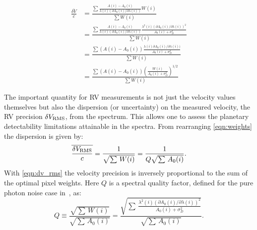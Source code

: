 \begin{align}
    \frac{\overline{\delta V}}{c} &= \frac{
        \sum{
            \frac
            {A(i) - {A}_{0}(i)}{
                \lambda(i) \left({\partial {A}_{0}(i)}/{\partial \lambda(i)}\right)} W(i)}
            }
            {\sum{{W(i)}}} \\
    &= \frac{
        \sum {
            \frac
                {A(i) - {A}_{0}(i)}
                {\lambda(i) (\partial {A}_{0}(i)/\partial \lambda(i))}
                \frac
                {{\lambda}^{2}(i) {({\partial {A}_{0}(i)}/{\partial \lambda(i)})}^{2}}
                {A_{0}(i) + {\sigma}^{2}_{D}}
             }
            }
        {\sum{{W(i)}}} \\
    &= \frac{
        \sum { 
            (A(i) - {A}_{0}(i))
            \frac
            {\lambda(i) {\partial {A}_{0}(i)}/{\partial \lambda(i)})}
            {A_{0}(i) + {\sigma}^{2}_{D}}
         }
        }
        {\sum{{W(i)}}} \\
    &= \frac{\sum{(A(i) - {A}_{0}(i)){\left(\frac{W(i)}{{A}_{0}(i) +{\sigma}_{D}^{2}}\right)}^{1/2}}}{\sum{W(i)}}
    \label{eqn:delta_v_eqarray}
\end{align}

The important quantity for {RV} measurements is not just the velocity values themselves but also the dispersion (or uncertainty) on the measured velocity, the {RV} precision \(\delta V_{\textrm{RMS}}\), from the spectrum.
This allows one to assess the planetary detectability limitations attainable in the spectra.
From rearranging \cref{eqn:weights} the dispersion is given by:
\begin{equation}
    \overline{\frac{\delta V_{\textrm{RMS}}}{c}} = \frac{1}{\sqrt{\sum{\,W(i)}}} = \frac{1}{Q \sqrt{\sum{\,{A}_{0}(i)}}}.\label{eqn:dv_rms}
\end{equation}
With \cref{eqn:dv_rms} the velocity precision is inversely proportional to the sum of the optimal pixel weights. Here \(Q\) is a spectral quality factor, defined for the pure photon noise case in~\cite{connes_absolute_1985, connes_demonstration_1996}, as:
\begin{equation}
Q \equiv \frac{\sqrt{\sum{\,W(i)}}}{\sqrt{\sum{\,{A}_{0}(i)}}} = \frac{\sqrt{\sum{\,\frac{{\lambda}^{2}(i) {({\partial {A}_{0}(i)}/{\partial \lambda(i)})}^{2}}{A_0(i) + {\sigma}^{2}_{D}}}}}{\sqrt{\sum{\,{A}_{0}(i)}}}.
\end{equation}

